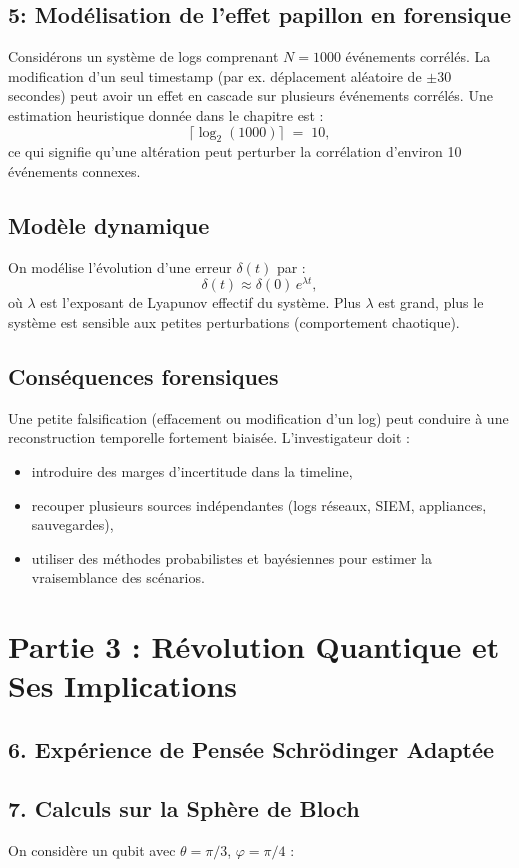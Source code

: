 \documentclass[12pt,a4paper]{article}
\begin{document}
	 \subsection*{5: Modélisation de l'effet papillon en forensique}
	 
	 Considérons un système de logs comprenant \(N=1000\) événements corrélés. La modification d'un seul timestamp (par ex. déplacement aléatoire de \(\pm 30\) secondes) peut avoir un effet en cascade sur plusieurs événements corrélés. Une estimation heuristique donnée dans le chapitre est :
	 \[
	 \lceil \log_2(1000) \rceil \;=\; 10,
	 \]
	 ce qui signifie qu'une altération peut perturber la corrélation d'environ 10 événements connexes.
	 
	 \subsection*{Modèle dynamique}
	 On modélise l'évolution d'une erreur \(\delta(t)\) par :
	 \[
	 \delta(t) \approx \delta(0)\, e^{\lambda t},
	 \]
	 où \(\lambda\) est l'exposant de Lyapunov effectif du système. Plus \(\lambda\) est grand, plus le système est sensible aux petites perturbations (comportement chaotique).
	 
	 \subsection*{Conséquences forensiques}
	 Une petite falsification (effacement ou modification d'un log) peut conduire à une reconstruction temporelle fortement biaisée. L'investigateur doit :
	 \begin{itemize}
	 	\item introduire des marges d'incertitude dans la timeline,
	 	\item recouper plusieurs sources indépendantes (logs réseaux, SIEM, appliances, sauvegardes),
	 	\item utiliser des méthodes probabilistes et bayésiennes pour estimer la vraisemblance des scénarios.
	 \end{itemize}
	 \section*{Partie 3 : Révolution Quantique et Ses Implications}
	 \subsection*{6. Expérience de Pensée Schrödinger Adaptée }
	 \subsection*{7. Calculs sur la Sphère de Bloch}
	  On considère un qubit avec \(\theta = \pi/3\), \(\varphi = \pi/4\) :
	
\end{document}
